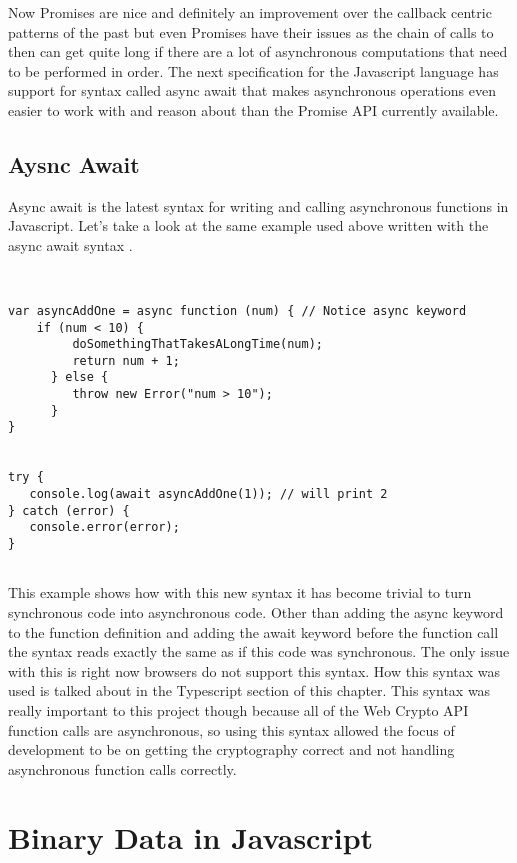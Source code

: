 Now Promises are nice and definitely an improvement over the callback centric patterns of the past but even Promises have their issues as the chain of calls to then can get quite long if there are a lot of asynchronous computations that need to be performed in order. The next specification for the Javascript language has support for syntax called async await that makes asynchronous operations even easier to work with and reason about than the Promise API currently available.


\subsection{Aysnc Await}


Async await is the latest syntax for writing and calling asynchronous functions in Javascript. Let's take a look at the same example used above written with the async await syntax \cite{js-asyncawait}.


\begin{lstlisting}


var asyncAddOne = async function (num) { // Notice async keyword
    if (num < 10) {
         doSomethingThatTakesALongTime(num);
         return num + 1;
      } else {
         throw new Error("num > 10");
      }   
}   


try {
   console.log(await asyncAddOne(1)); // will print 2
} catch (error) {
   console.error(error);
}


\end{lstlisting}


This example shows how with this new syntax it has become trivial to turn synchronous code into asynchronous code. Other than adding the async keyword to the function definition and adding the await keyword before the function call the syntax reads exactly the same as if this code was synchronous. The only issue with this is right now browsers do not support this syntax. How this syntax was used is talked about in the Typescript section of this chapter. This syntax was really important to this project though because all of the Web Crypto API function calls are asynchronous, so using this syntax allowed the focus of development to be on getting the cryptography correct and not handling asynchronous function calls correctly.


\section{Binary Data in Javascript}


